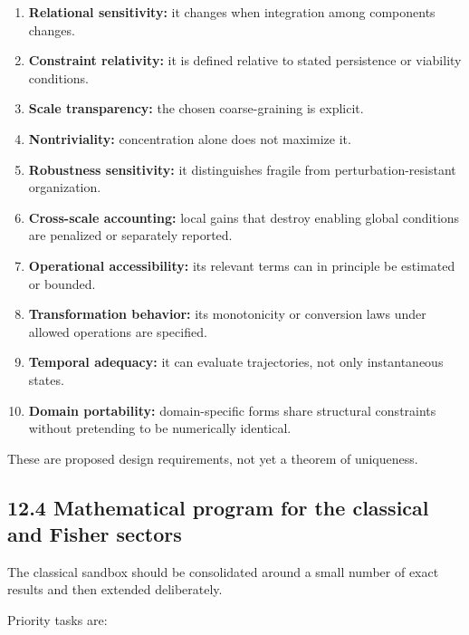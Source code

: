 \documentclass[
  11pt,
]{article}
\providecommand{\tightlist}{%
  \setlength{\itemsep}{0pt}\setlength{\parskip}{0pt}}
\begin{document}
\begin{enumerate}
\def\labelenumi{\arabic{enumi}.}
\tightlist
\item
  \textbf{Relational sensitivity:} it changes when integration among
  components changes.
\item
  \textbf{Constraint relativity:} it is defined relative to stated
  persistence or viability conditions.
\item
  \textbf{Scale transparency:} the chosen coarse-graining is explicit.
\item
  \textbf{Nontriviality:} concentration alone does not maximize it.
\item
  \textbf{Robustness sensitivity:} it distinguishes fragile from
  perturbation-resistant organization.
\item
  \textbf{Cross-scale accounting:} local gains that destroy enabling
  global conditions are penalized or separately reported.
\item
  \textbf{Operational accessibility:} its relevant terms can in
  principle be estimated or bounded.
\item
  \textbf{Transformation behavior:} its monotonicity or conversion laws
  under allowed operations are specified.
\item
  \textbf{Temporal adequacy:} it can evaluate trajectories, not only
  instantaneous states.
\item
  \textbf{Domain portability:} domain-specific forms share structural
  constraints without pretending to be numerically identical.
\end{enumerate}

These are proposed design requirements, not yet a theorem of uniqueness.

\subsection{12.4 Mathematical program for the classical and Fisher
sectors}\label{mathematical-program-for-the-classical-and-fisher-sectors}

The classical sandbox should be consolidated around a small number of
exact results and then extended deliberately.

Priority tasks are:
\end{document}
